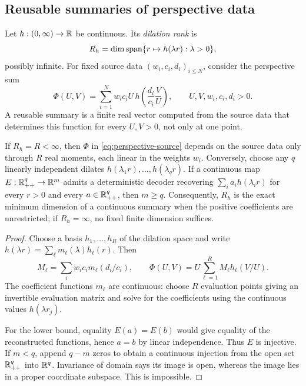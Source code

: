 \subsection{Reusable summaries of perspective data}

Let $h:(0,\infty)\to\mathbb R$ be continuous. Its \emph{dilation rank} is
\[
 R_h=\dim\operatorname{span}\{r\mapsto h(\lambda r):\lambda>0\},
\]
possibly infinite. For fixed source data $(w_i,c_i,d_i)_{i\leq N}$,
consider the perspective sum
\begin{equation}\label{eq:perspective-source}
 \Phi(U,V)=\sum_{i=1}^N w_i c_i U\,
       h\!\left(\frac{d_i}{c_i}\frac VU\right),
 \qquad U,V,w_i,c_i,d_i>0.
\end{equation}
A reusable summary is a finite real vector computed from the source data
that determines this function for every $U,V>0$, not only at one point.

\begin{theorem}\label{thm:dilation-summary}
If $R_h=R<\infty$, then $\Phi$ in \eqref{eq:perspective-source} depends
on the source data only through $R$ real moments, each linear in the
weights $w_i$.
Conversely, choose any $q$ linearly independent dilates
$h(\lambda_1r),\ldots,h(\lambda_qr)$. If a continuous map
$E:\mathbb R_{++}^q\to\mathbb R^m$ admits a deterministic decoder recovering
$\sum_i a_i h(\lambda_i r)$ for every $r>0$ and every
$a\in\mathbb R_{++}^q$, then $m\geq q$. Consequently, $R_h$ is the exact minimum
dimension of a continuous summary when the positive coefficients are
unrestricted; if $R_h=\infty$, no fixed finite dimension suffices.
\end{theorem}
\begin{proof}
Choose a basis $h_1,\ldots,h_R$ of the dilation space and write
$h(\lambda r)=\sum_\ell m_\ell(\lambda)h_\ell(r)$. Then
\[
 M_\ell=\sum_i w_i c_i m_\ell(d_i/c_i),
 \qquad
 \Phi(U,V)=U\sum_{\ell=1}^R M_\ell h_\ell(V/U).
\]
The coefficient functions $m_\ell$ are continuous: choose $R$ evaluation
points giving an invertible evaluation matrix and solve for the
coefficients using the continuous values $h(\lambda r_j)$.

For the lower bound, equality $E(a)=E(b)$ would give equality of the
reconstructed functions, hence $a=b$ by linear independence. Thus $E$
is injective. If $m<q$, append $q-m$ zeros to obtain a continuous
injection from the open set $\mathbb R_{++}^q$ into $\mathbb R^q$. Invariance of domain
\cite[Theorem~2B.3]{Hatcher2002} says its image is open, whereas the image
lies in a proper coordinate subspace. This is impossible.
\end{proof}

